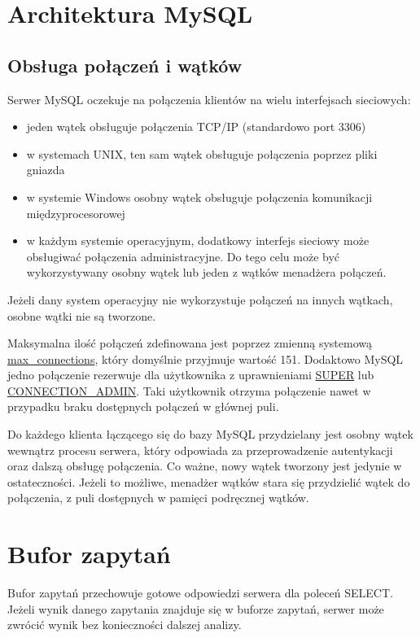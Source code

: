 \section{Architektura MySQL}

\subsection{Obsługa połączeń i wątków}
Serwer MySQL oczekuje na połączenia klientów na wielu interfejsach sieciowych:
\begin{itemize}
\item jeden wątek obsługuje połączenia TCP/IP (standardowo port 3306)
\item w systemach UNIX, ten sam wątek obsługuje połączenia poprzez pliki gniazda
\item w systemie Windows osobny wątek obsługuje połączenia komunikacji międzyprocesorowej
\item w każdym systemie operacyjnym, dodatkowy interfejs sieciowy może obsługiwać połączenia administracyjne. Do tego celu może być wykorzystywany osobny wątek lub jeden z wątków menadżera połączeń.
\end{itemize}

Jeżeli dany system operacyjny nie wykorzystuje połączeń na innych wątkach, osobne wątki nie są tworzone.

Maksymalna ilość połączeń zdefinowana jest poprzez zmienną systemową \underline{max\_connections}, który domyślnie przyjmuje wartość 151. Dodaktowo MySQL jedno połączenie rezerwuje dla użytkownika z uprawnieniami \underline{SUPER} lub \underline{CONNECTION\_ADMIN}. Taki użytkownik otrzyma połączenie nawet w przypadku braku dostępnych połączeń w głównej puli.

Do każdego klienta łączącego się do bazy MySQL przydzielany jest osobny wątek wewnątrz procesu serwera, który odpowiada za przeprowadzenie autentykacji oraz dalszą obsługę połączenia. Co ważne, nowy wątek tworzony jest jedynie w ostateczności. Jeżeli to możliwe, menadżer wątków stara się przydzielić wątek do połączenia, z puli dostępnych w pamięci podręcznej wątków.

\section{Bufor zapytań}
Bufor zapytań przechowuje gotowe odpowiedzi serwera dla poleceń SELECT. Jeżeli wynik danego zapytania znajduje się w buforze zapytań, serwer może zwrócić wynik bez konieczności dalszej analizy.

